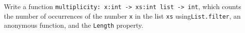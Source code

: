 Write a function \mbox{\lstinline{multiplicity: x:int -> xs:int list -> int}}, which counts the number of occurrences of the number \lstinline{x} in the list \lstinline{xs} using\lstinline{List.filter}, an anonymous function, and the \lstinline{Length} property.
